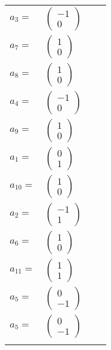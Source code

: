 \documentclass[1p]{elsarticle_modified}
\theoremstyle{definition}
\begin{document}
\begin{tabular}{m{7pt} m{180pt} m{7pt} m{180pt} }
\flushright $a_{3}=$&$\begin{pmatrix}-1\\0\end{pmatrix}$ \\
\flushright $a_{7}=$&$\begin{pmatrix}1\\0\end{pmatrix}$ \\
\flushright $a_{8}=$&$\begin{pmatrix}1\\0\end{pmatrix}$ \\
\flushright $a_{4}=$&$\begin{pmatrix}-1\\0\end{pmatrix}$ \\
\flushright $a_{9}=$&$\begin{pmatrix}1\\0\end{pmatrix}$ \\
\flushright $a_{1}=$&$\begin{pmatrix}0\\1\end{pmatrix}$ \\
\flushright $a_{10}=$&$\begin{pmatrix}1\\0\end{pmatrix}$ \\
\flushright $a_{2}=$&$\begin{pmatrix}-1\\1\end{pmatrix}$ \\
\flushright $a_{6}=$&$\begin{pmatrix}1\\0\end{pmatrix}$ \\
\flushright $a_{11}=$&$\begin{pmatrix}1\\1\end{pmatrix}$ \\
\flushright $a_{5}=$&$\begin{pmatrix}0\\-1\end{pmatrix}$\\ \flushright $a_{5}=$&$\begin{pmatrix}0\\-1\end{pmatrix}$\\&\end{tabular}
\end{document}
